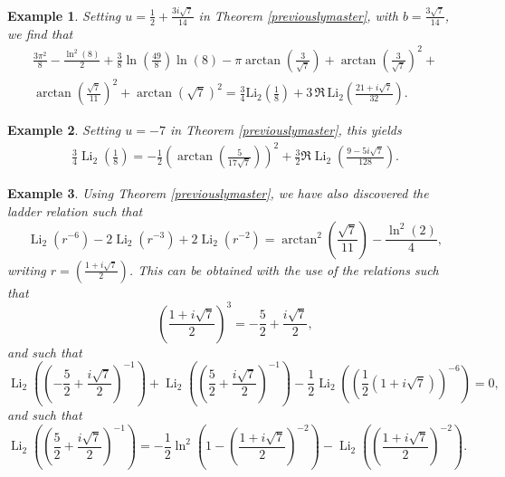 \documentclass[12pt]{article}
\newtheorem{example}{Example}
\begin{document}
\begin{example}
 Setting $u = \frac{1}{2} + \frac{3i\sqrt{7}}{14}$ in Theorem \ref{previouslymaster}, with $b= \frac{3\sqrt{7}}{14}$, we find that 
\begin{multline*}
 \frac{3\pi^2}{8} - \frac{\ln^2(8)}{2} + \frac{3}{8} \ln\left(\frac{49}{8}\right) \ln(8) 
 - \pi \operatorname{arctan} \left(\frac{3}{\sqrt{7}}\right) 
 + \operatorname{arctan} \left(\frac{3}{\sqrt{7}}\right)^2 + \\ 
 \operatorname{arctan} \left(\frac{\sqrt{7}}{11}\right)^2 
 + \operatorname{arctan} (\sqrt{7})^2 
 = \frac{3 }{4} \mathrm{Li}_2\left(\frac{1}{8}\right)+ 3 \, \Re \, \mathrm{Li}_2 \left(\frac{21 + i \sqrt{7}}{32} \right). 
\end{multline*}
\end{example}

\begin{example}
 Setting $u=-7$ in Theorem \ref{previouslymaster}, this yields 
\begin{equation*}
\begin{aligned}
\frac{3}{4} \operatorname{Li}_2\left(\frac{1}{8}\right)= - \frac{1}{2} \left(\operatorname{arctan} \left(\frac{5}{17 \sqrt{7}}\right)\right)^2 + \frac{3}{2}\Re\operatorname{Li}_2\left(\frac{9 - 5 i \sqrt{7}}{128}\right). 
\end{aligned}
\end{equation*}
\end{example}

\begin{example}
 Using Theorem \ref{previouslymaster}, we have also discovered the ladder relation such that 
\begin{equation}\label{previously8p8}
 \operatorname{Li}_2(r^{-6}) - 2 \operatorname{Li}_2(r^{-3}) 
 + 2 \operatorname{Li}_2\left(r^{-2}\right) = \arctan^2\left(\frac{\sqrt{7}}{11}\right) 
 - \frac{\ln^2(2)}{4}, 
\end{equation}
 writing $r=\left(\frac{1 + i \sqrt{7}}{2}\right)$. This can be obtained with the use of the relations such that 
 $$ \left( \frac{1 + i \sqrt{7}}{2} \right)^3 = -\frac{5}{2} + \frac{i \sqrt{7}}{2}, $$
 and such that 
 $$ \operatorname{Li}_2\left( \left( -\frac{5}{2} + \frac{i \sqrt{7}}{2} \right)^{-1} \right)
+ \operatorname{Li}_2\left( \left( \frac{5}{2} + \frac{i \sqrt{7}}{2} \right)^{-1} \right)
- \frac{1}{2} \operatorname{Li}_2\left( \left( \frac{1}{2}(1 + i \sqrt{7}) \right)^{-6} \right) = 0, $$
 and such that 
 $$ \operatorname{Li}_2\left( \left( \frac{5}{2} + \frac{i \sqrt{7}}{2} \right)^{-1} \right)
 = -\frac{1}{2} \ln^2\left( 1 - \left( \frac{1 + i \sqrt{7}}{2} \right)^{-2} \right) 
 - \operatorname{Li}_2\left( \left( \frac{1 + i \sqrt{7}}{2} \right)^{-2} \right). $$
\end{example}
\end{document}
